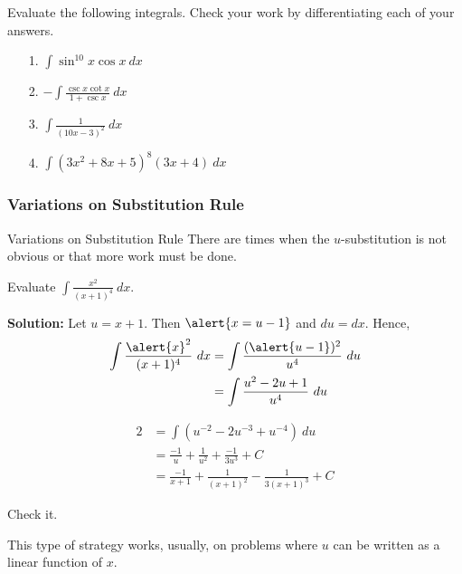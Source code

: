 \documentclass[cal1spr16Lectures.tex]{subfiles}
\begin{document}
\begin{frame}\footnotesize
\begin{exe} Evaluate the following integrals.  Check your work by differentiating each of your answers.
\begin{itemize}
\item[1. ] $\int \sin^{10} x \cos x \ dx$
\item[2. ] $-\int \frac{\csc x \cot x}{1+\csc x}\ dx$
\item[3. ] $\int \frac{1}{(10x-3)^2}\ dx$
\item[4. ] $\int (3x^2 + 8x + 5)^8 (3x+4)\ dx$
\end{itemize}
\end{exe}
\end{frame}

\subsubsection{Variations on Substitution Rule}

\begin{frame}{\small Variations on Substitution Rule}\footnotesize
There are times when the $u$-substitution is not obvious or that more work must be done.
\begin{ex} 
Evaluate $\int \frac{x^2}{(x+1)^4}\ dx.$ 
\end{ex}

{\bf Solution:}  Let $u=x+1$.  Then $\alert{x=u-1}$ and $du=dx$.  Hence,
\begin{alignat*}{2}
\int \frac{\alert{x}^2}{(x+1)^4}\ dx &= \int \frac{(\alert{u-1})^2}{u^4}\ du \\
&= \int \frac{u^2-2u+1}{u^4}\ du 
\end{alignat*}
\end{frame}

\begin{frame}\footnotesize
\begin{alignat*}{2}
&= \int \left(u^{-2}-2u^{-3}+u^{-4} \right) \ du \\
&= \frac{-1}{u} + \frac{1}{u^2} + \frac{-1}{3u^3} + C \\
&= \frac{-1}{x+1} + \frac{1}{(x+1)^2} - \frac{1}{3(x+1)^3} + C
\end{alignat*}
%
\begin{exe}Check it. \end{exe}
%
This type of strategy works, usually, on problems where $u$ can be written as a linear function of $x$.
\end{frame}
\end{document}
